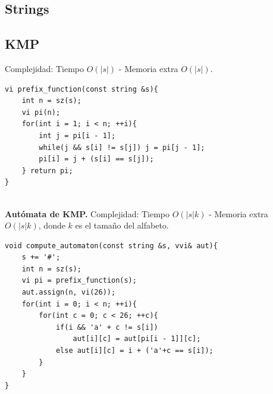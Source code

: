 \documentclass[10pt,spanish,mexico]{article}
\numberwithin{equation}{section}
\begin{document}
\begin{multicols}{2}
\section{Strings}
\subsection{KMP}
Complejidad: Tiempo $O(|s|)$ - Memoria extra $O(|s|)$.
\begin{verbatim}
vi prefix_function(const string &s){
    int n = sz(s);
    vi pi(n);
    for(int i = 1; i < n; ++i){
        int j = pi[i - 1];
        while(j && s[i] != s[j]) j = pi[j - 1];
        pi[i] = j + (s[i] == s[j]);
    } return pi;
}
\end{verbatim}

\vspace{-1.2\baselineskip}
\hrulefill\\
\textbf{Autómata de KMP.} Complejidad: Tiempo $O(|s|k)$ - Memoria extra $O(|s|k)$, donde $k$ es el tamaño del alfabeto.
\begin{verbatim}
void compute_automaton(const string &s, vvi& aut){
    s += '#';
    int n = sz(s);
    vi pi = prefix_function(s);
    aut.assign(n, vi(26));
    for(int i = 0; i < n; ++i){
        for(int c = 0; c < 26; ++c){
            if(i && 'a' + c != s[i])
                aut[i][c] = aut[pi[i - 1]][c];
            else aut[i][c] = i + ('a'+c == s[i]);
        }
    }
}
\end{verbatim}

\vspace{-1.2\baselineskip}
\hrulefill

\end{multicols}
\end{document}
